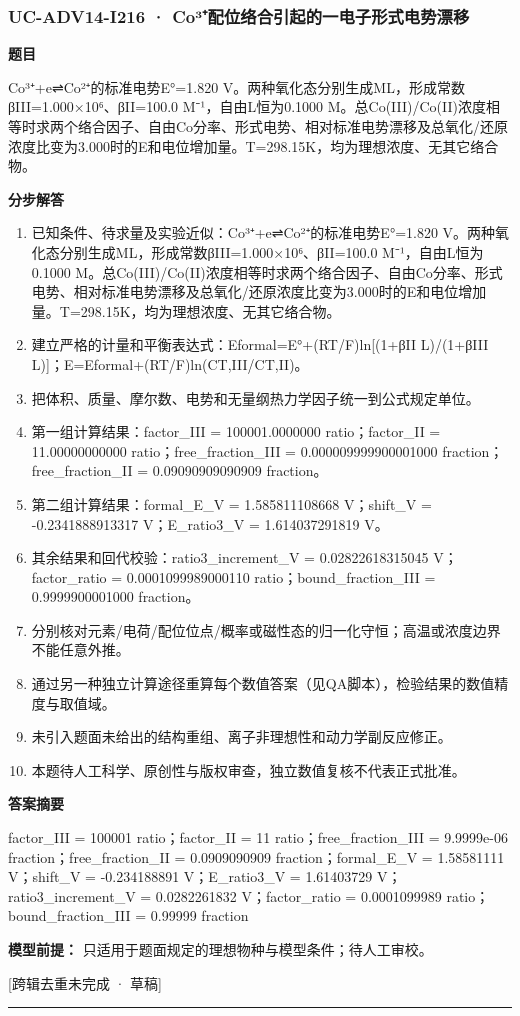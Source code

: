 \documentclass[UTF8,11pt,a4paper]{ctexart}
\begin{document}
\subsubsection*{UC-ADV14-I216 · Co³⁺配位络合引起的一电子形式电势漂移}
\noindent\textbf{题目}\par
Co³⁺+e⇌Co²⁺的标准电势E°=1.820 V。两种氧化态分别生成ML，形成常数βIII=1.000×10⁶、βII=100.0 M⁻¹，自由L恒为0.1000 M。总Co(III)/Co(II)浓度相等时求两个络合因子、自由Co分率、形式电势、相对标准电势漂移及总氧化/还原浓度比变为3.000时的E和电位增加量。T=298.15K，均为理想浓度、无其它络合物。\par
\medskip\noindent\textbf{分步解答}
\begin{enumerate}
\item 已知条件、待求量及实验近似：Co³⁺+e⇌Co²⁺的标准电势E°=1.820 V。两种氧化态分别生成ML，形成常数βIII=1.000×10⁶、βII=100.0 M⁻¹，自由L恒为0.1000 M。总Co(III)/Co(II)浓度相等时求两个络合因子、自由Co分率、形式电势、相对标准电势漂移及总氧化/还原浓度比变为3.000时的E和电位增加量。T=298.15K，均为理想浓度、无其它络合物。
\item 建立严格的计量和平衡表达式：Eformal=E°+(RT/F)ln[(1+βII L)/(1+βIII L)]；E=Eformal+(RT/F)ln(CT,III/CT,II)。
\item 把体积、质量、摩尔数、电势和无量纲热力学因子统一到公式规定单位。
\item 第一组计算结果：factor\_III = 100001.0000000 ratio；factor\_II = 11.00000000000 ratio；free\_fraction\_III = 0.000009999900001000 fraction；free\_fraction\_II = 0.09090909090909 fraction。
\item 第二组计算结果：formal\_E\_V = 1.585811108668 V；shift\_V = -0.2341888913317 V；E\_ratio3\_V = 1.614037291819 V。
\item 其余结果和回代校验：ratio3\_increment\_V = 0.02822618315045 V；factor\_ratio = 0.0001099989000110 ratio；bound\_fraction\_III = 0.9999900001000 fraction。
\item 分别核对元素/电荷/配位位点/概率或磁性态的归一化守恒；高温或浓度边界不能任意外推。
\item 通过另一种独立计算途径重算每个数值答案（见QA脚本），检验结果的数值精度与取值域。
\item 未引入题面未给出的结构重组、离子非理想性和动力学副反应修正。
\item 本题待人工科学、原创性与版权审查，独立数值复核不代表正式批准。
\end{enumerate}
\noindent\textbf{答案摘要}\par
factor\_III = 100001 ratio；factor\_II = 11 ratio；free\_fraction\_III = 9.9999e-06 fraction；free\_fraction\_II = 0.0909090909 fraction；formal\_E\_V = 1.58581111 V；shift\_V = -0.234188891 V；E\_ratio3\_V = 1.61403729 V；ratio3\_increment\_V = 0.0282261832 V；factor\_ratio = 0.0001099989 ratio；bound\_fraction\_III = 0.99999 fraction\par
\noindent\textbf{模型前提：}
只适用于题面规定的理想物种与模型条件；待人工审校。\par
\noindent\textcolor{red!65!black}{[跨辑去重未完成 · 草稿]} \par
\medskip\hrule\medskip
{}
\end{document}
